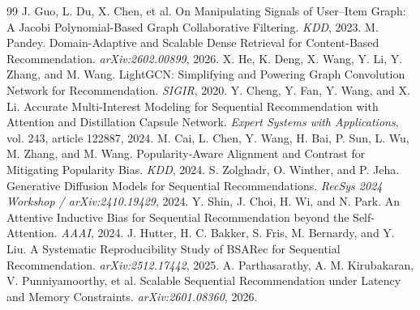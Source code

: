 \documentclass[11pt,a4paper]{article}
\begin{document}
\begin{thebibliography}{99}
 J. Guo, L. Du, X. Chen, et al. On Manipulating Signals of User--Item Graph: A Jacobi Polynomial-Based Graph Collaborative Filtering. \emph{KDD}, 2023.
 M. Pandey. Domain-Adaptive and Scalable Dense Retrieval for Content-Based Recommendation. \emph{arXiv:2602.00899}, 2026.
 X. He, K. Deng, X. Wang, Y. Li, Y. Zhang, and M. Wang. LightGCN: Simplifying and Powering Graph Convolution Network for Recommendation. \emph{SIGIR}, 2020.
 Y. Cheng, Y. Fan, Y. Wang, and X. Li. Accurate Multi-Interest Modeling for Sequential Recommendation with Attention and Distillation Capsule Network. \emph{Expert Systems with Applications}, vol. 243, article 122887, 2024.
 M. Cai, L. Chen, Y. Wang, H. Bai, P. Sun, L. Wu, M. Zhang, and M. Wang. Popularity-Aware Alignment and Contrast for Mitigating Popularity Bias. \emph{KDD}, 2024.
 S. Zolghadr, O. Winther, and P. Jeha. Generative Diffusion Models for Sequential Recommendations. \emph{RecSys 2024 Workshop / arXiv:2410.19429}, 2024.
 Y. Shin, J. Choi, H. Wi, and N. Park. An Attentive Inductive Bias for Sequential Recommendation beyond the Self-Attention. \emph{AAAI}, 2024.
 J. Hutter, H. C. Bakker, S. Fris, M. Bernardy, and Y. Liu. A Systematic Reproducibility Study of BSARec for Sequential Recommendation. \emph{arXiv:2512.17442}, 2025.
 A. Parthasarathy, A. M. Kirubakaran, V. Punniyamoorthy, et al. Scalable Sequential Recommendation under Latency and Memory Constraints. \emph{arXiv:2601.08360}, 2026.
\end{thebibliography}
\end{document}
